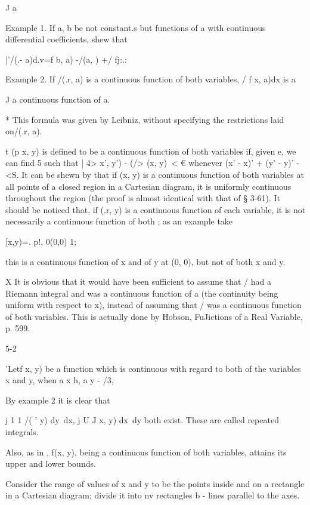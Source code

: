 J a

Example 1. If a, b be not constant.s but functions of a with
continuous differential coefficients, shew that

 |'/(.- a)d.v=f b, a) -/(a, ) +/ fj:.:

Example 2. If /(.r, a) is a continuous function of both variables, / f
x, a)dx is a

J a continuous function of a.

* This formula was given by Leibniz, without specifying the
restrictions laid on/(.r, a).

t (p x, y) is defined to be a continuous function of both variables
if, given e, we can find 5 such that | 4> x', y') - (/> (x, y)\ < €
whenever (x' - x)' + (y' - y)' -<S. It can be shewn by  that if
(x, y) is a continuous function of both variables at all points of a
closed region in a Cartesian diagram, it is uniformly continuous
throughout the region (the proof is almost identical with that of §
3-61). It should be noticed that, if (.r, y) is a continuous function
of each variable, it is not necessarily a continuous function of both
; as an example take

 [x,y)=. p!, 0(0,0) 1;

this is a continuous function of x and of y at (0, 0), but not of both
x and y.

X It is obvious that it would have been sufficient to assume that /
had a Riemann integral and was a continuous function of a (the
continuity being uniform with respect to x), instead of assuming that
/ was a continuous function of both variables. This is actually done
by Hobson, FuJictions of a Real Variable, p. 599.

5-2

%
%


'Letf x, y) be a function which is continuous with regard to both of
the variables x and y, when a x h, a y - /3,

By  example 2 it is clear that

j 1 1 /( ' y) dy\ dx, j U J x, y) dx\ dy both exist. These are called
repeated integrals.

Also, as in , f(x, y), being a continuous function of both
variables, attains its upper and lower bounds.

Consider the range of values of x and y to be the points inside and on
a rectangle in a Cartesian diagram; divide it into nv rectangles b -
lines parallel to the axes.

